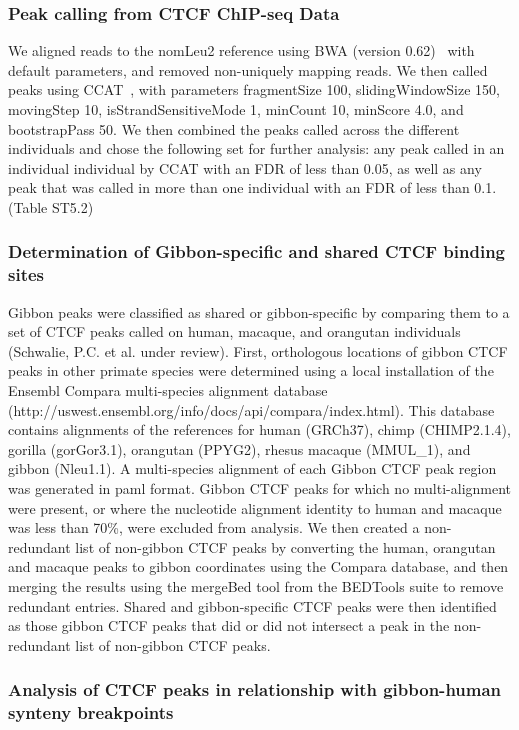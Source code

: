 \subsubsection{Peak calling from CTCF ChIP-seq Data}

We aligned reads to the nomLeu2 reference using BWA (version 0.62)~\cite{Li:2009p836} with default parameters, and removed non-uniquely mapping reads. We then called peaks using CCAT~\cite{Xu:2010fu}, with parameters fragmentSize 100, slidingWindowSize 150, movingStep 10, isStrandSensitiveMode 1, minCount 10, minScore 4.0, and bootstrapPass 50. We then combined the peaks called across the different individuals and chose the following set for further analysis: any peak called in an individual individual by CCAT with an FDR of less than 0.05, as well as any peak that was called in more than one individual with an FDR of less than 0.1. (Table ST5.2)

\subsubsection{Determination of Gibbon-specific and shared CTCF binding sites}

Gibbon peaks were classified as shared or gibbon-specific by comparing them to a set of CTCF peaks called on human, macaque, and orangutan individuals (Schwalie, P.C. et al. under review). First, orthologous locations of gibbon CTCF peaks in other primate species were determined using a local installation of the Ensembl Compara multi-species alignment database (http://uswest.ensembl.org/info/docs/api/compara/index.html). This database contains alignments of the references for human (GRCh37), chimp (CHIMP2.1.4), gorilla (gorGor3.1), orangutan (PPYG2), rhesus macaque (MMUL\_1), and gibbon (Nleu1.1). A multi-species alignment of each Gibbon CTCF peak region was generated in paml format. Gibbon CTCF peaks for which no multi-alignment were present, or where the nucleotide alignment identity to human and macaque was less than 70\%, were excluded from analysis. We then created a non-redundant list of non-gibbon CTCF peaks by converting the human, orangutan and macaque peaks to gibbon coordinates using the Compara database, and then merging the results using the mergeBed tool from the BEDTools suite to remove redundant entries. Shared and gibbon-specific CTCF peaks were then identified as those gibbon CTCF peaks that did or did not intersect a peak in the non-redundant list of non-gibbon CTCF peaks.

\subsubsection{Analysis of CTCF peaks in relationship with gibbon-human synteny breakpoints}

